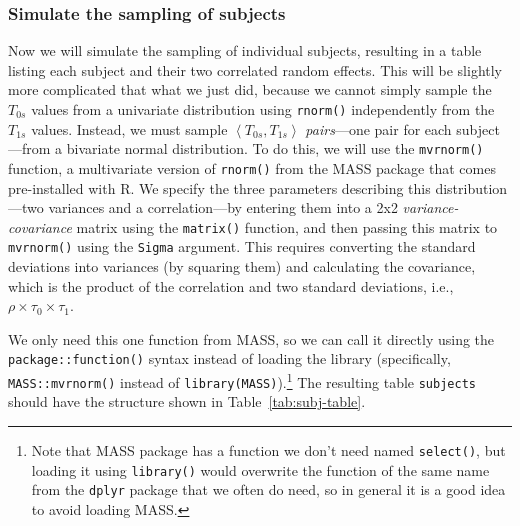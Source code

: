 \documentclass[
  english,
  doc,floatsintext]{apa6}
\begin{document}
\hypertarget{simulate-the-sampling-of-subjects}{%
\subsubsection{Simulate the sampling of subjects}\label{simulate-the-sampling-of-subjects}}

Now we will simulate the sampling of individual subjects, resulting in a table listing each subject and their two correlated random effects. This will be slightly more complicated that what we just did, because we cannot simply sample the \(T_{0s}\) values from a univariate distribution using \texttt{rnorm()} independently from the \(T_{1s}\) values. Instead, we must sample \(\left<T_{0s}, T_{1s}\right>\) \emph{pairs}---one pair for each subject---from a bivariate normal distribution. To do this, we will use the \texttt{mvrnorm()} function, a multivariate version of \texttt{rnorm()} from the MASS package that comes pre-installed with R. We specify the three parameters describing this distribution---two variances and a correlation---by entering them into a 2x2 \emph{variance-covariance} matrix using the \texttt{matrix()} function, and then passing this matrix to \texttt{mvrnorm()} using the \texttt{Sigma} argument. This requires converting the standard deviations into variances (by squaring them) and calculating the covariance, which is the product of the correlation and two standard deviations, i.e., \(\rho \times \tau_0 \times \tau_1\).

We only need this one function from MASS, so we can call it directly using the \texttt{package::function()} syntax instead of loading the library (specifically, \texttt{MASS::mvrnorm()} instead of \texttt{library(MASS)}).\footnote{Note that MASS package has a function we don't need named \texttt{select()}, but loading it using \texttt{library()} would overwrite the function of the same name from the \texttt{dplyr} package that we often do need, so in general it is a good idea to avoid loading MASS.} The resulting table \texttt{subjects} should have the structure shown in Table~\ref{tab:subj-table}.
\end{document}
